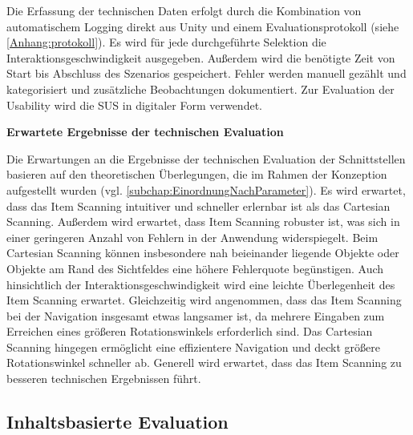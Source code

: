 Die Erfassung der technischen Daten erfolgt durch die Kombination von automatischem Logging direkt aus Unity und einem Evaluationsprotokoll (siehe \autoref{Anhang:protokoll}). Es wird für jede durchgeführte Selektion die Interaktionsgeschwindigkeit ausgegeben. Außerdem wird die benötigte Zeit von Start bis Abschluss des Szenarios gespeichert. Fehler werden manuell gezählt und kategorisiert und zusätzliche Beobachtungen dokumentiert. Zur Evaluation der Usability wird die SUS \citep{brooke_sus_1996} in digitaler Form verwendet.

\textbf{Erwartete Ergebnisse der technischen Evaluation}

Die Erwartungen an die Ergebnisse der technischen Evaluation der Schnittstellen basieren auf den theoretischen Überlegungen, die im Rahmen der Konzeption aufgestellt wurden (vgl. \autoref{subchap:EinordnungNachParameter}). Es wird erwartet, dass das Item Scanning intuitiver und schneller erlernbar ist als das Cartesian Scanning. Außerdem wird erwartet, dass Item Scanning robuster ist, was sich in einer geringeren Anzahl von Fehlern in der Anwendung widerspiegelt. Beim Cartesian Scanning können insbesondere nah beieinander liegende Objekte oder Objekte am Rand des Sichtfeldes eine höhere Fehlerquote begünstigen. Auch hinsichtlich der Interaktionsgeschwindigkeit wird eine leichte Überlegenheit des Item Scanning erwartet.
Gleichzeitig wird angenommen, dass das Item Scanning bei der Navigation insgesamt etwas langsamer ist, da mehrere Eingaben zum Erreichen eines größeren Rotationswinkels erforderlich sind. Das Cartesian Scanning hingegen ermöglicht eine effizientere Navigation und deckt größere Rotationswinkel schneller ab. Generell wird erwartet, dass das Item Scanning zu besseren technischen Ergebnissen führt.

\subsection{Inhaltsbasierte Evaluation}

